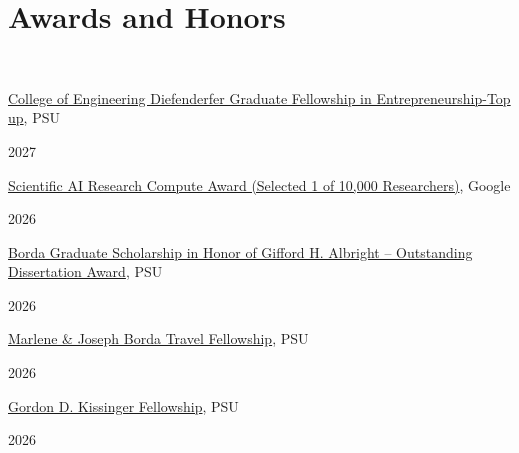 \documentclass[]{Keval-resume}
\begin{document}
{{%

\sectionsep


\section{Awards and Honors} 
\hrulefill
\postsectionsep \\
\begin{minipage}[t]{.95\textwidth}
	\textbullet{}  {\href{}{College of Engineering Diefenderfer Graduate Fellowship in Entrepreneurship-Top up}, PSU} 
\end{minipage}%
\begin{minipage}[t]{.05\textwidth}
	\hfill 2027
\end{minipage}
\begin{minipage}[t]{.95\textwidth}
	\textbullet{}  {\href{https://blog.google}{Scientific AI Research Compute Award (Selected 1 of 10,000 Researchers)}, Google} 
\end{minipage}%
\begin{minipage}[t]{.05\textwidth}
	\hfill 2026
\end{minipage}
\begin{minipage}[t]{.95\textwidth}
	\textbullet{}  {\href{}{Borda Graduate Scholarship in Honor of Gifford H. Albright – Outstanding Dissertation Award}, PSU} 
\end{minipage}%
\begin{minipage}[t]{.05\textwidth}
	\hfill 2026
\end{minipage}
\begin{minipage}[t]{.95\textwidth}
	\textbullet{}  {\href{}{Marlene \& Joseph Borda Travel Fellowship}, PSU} 
\end{minipage}%
\begin{minipage}[t]{.05\textwidth}
	\hfill 2026
\end{minipage}
\begin{minipage}[t]{.95\textwidth}
	\textbullet{}  \href{}{Gordon D. Kissinger Fellowship}, PSU
\end{minipage}%
\begin{minipage}[t]{.05\textwidth}
	\hfill 2026
\end{minipage}
\begin{minipage}[t]{.95\textwidth}

\end{minipage}}}
\end{document}
